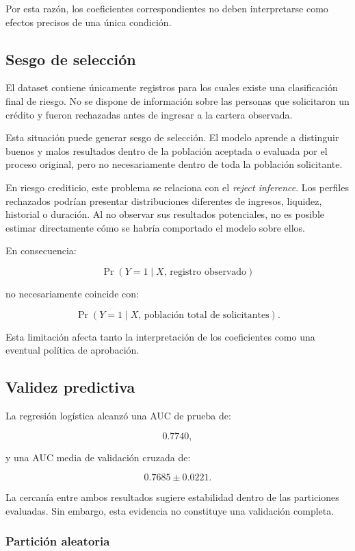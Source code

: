 Por esta razón, los coeficientes correspondientes no deben interpretarse
como efectos precisos de una única condición.

\subsection{Sesgo de selección}

El dataset contiene únicamente registros para los cuales existe una
clasificación final de riesgo. No se dispone de información sobre las
personas que solicitaron un crédito y fueron rechazadas antes de ingresar
a la cartera observada.

Esta situación puede generar sesgo de selección. El modelo aprende a
distinguir buenos y malos resultados dentro de la población aceptada o
evaluada por el proceso original, pero no necesariamente dentro de toda
la población solicitante.

En riesgo crediticio, este problema se relaciona con el
\textit{reject inference}. Los perfiles rechazados podrían presentar
distribuciones diferentes de ingresos, liquidez, historial o duración.
Al no observar sus resultados potenciales, no es posible estimar
directamente cómo se habría comportado el modelo sobre ellos.

En consecuencia:

\[
\Pr
\left(
    Y=1
    \mid
    X,\,
    \text{registro observado}
\right)
\]

no necesariamente coincide con:

\[
\Pr
\left(
    Y=1
    \mid
    X,\,
    \text{población total de solicitantes}
\right).
\]

Esta limitación afecta tanto la interpretación de los coeficientes como
una eventual política de aprobación.

\subsection{Validez predictiva}

La regresión logística alcanzó una AUC de prueba de:

\[
0.7740,
\]

y una AUC media de validación cruzada de:

\[
0.7685
\pm
0.0221.
\]

La cercanía entre ambos resultados sugiere estabilidad dentro de las
particiones evaluadas. Sin embargo, esta evidencia no constituye una
validación completa.

\subsubsection{Partición aleatoria}


